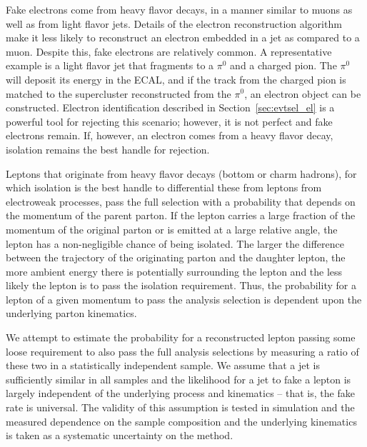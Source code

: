 Fake electrons come from heavy flavor decays, in a manner similar to muons
as well as from light flavor jets. Details of the electron reconstruction
algorithm make it less likely to reconstruct an electron embedded in a \hpt jet
as compared to a muon. Despite this, fake electrons are relatively common.
A representative example is a light flavor jet that fragments
to a $\pi^0$ and a charged pion. The $\pi^0$ will deposit its energy in the
ECAL, and if the track from the charged pion is matched to the supercluster
reconstructed from the $\pi^0$, an electron object can be constructed. Electron
identification described in Section~\ref{sec:evtsel_el} is a powerful tool
for rejecting this scenario; however, it is not perfect and fake electrons
remain. If, however, an electron comes from a heavy flavor decay, isolation
remains the best handle for rejection.

Leptons that originate from heavy flavor decays (bottom or charm hadrons), for
which isolation is the best handle to differential these from leptons from
electroweak processes, pass the full selection with a probability that depends
on the momentum of the parent parton. If the lepton carries a large fraction of
the momentum of the original parton or is emitted at a large relative angle,
the lepton has a non-negligible chance of being isolated. The larger the
difference between the trajectory of the originating parton and the daughter
lepton, the more ambient energy there is potentially surrounding the lepton
and the less likely the lepton is to pass the isolation requirement. Thus, the
probability for a lepton of a given momentum to pass the analysis selection is
dependent upon the underlying parton kinematics.

We attempt to estimate the probability for a reconstructed lepton passing some
loose requirement to also pass the full analysis selections by measuring a
ratio of these two in a statistically independent sample. We assume that a jet
is sufficiently similar in all samples and the likelihood for a jet to fake
a lepton is largely independent of the underlying process and kinematics --
that is, the fake rate is universal. The validity of this assumption is tested
in simulation and the measured dependence on the sample composition and the
underlying kinematics is taken as a systematic uncertainty on the method.

